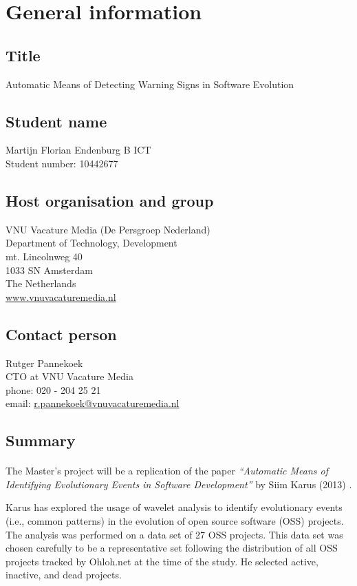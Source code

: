 \section{General information}
\subsection{Title}
Automatic Means of Detecting Warning Signs in Software Evolution

\subsection{Student name}
Martijn Florian Endenburg B ICT \\
Student number: 10442677

\subsection{Host organisation and group}
VNU Vacature Media (De Persgroep Nederland) \\
Department of Technology, Development \\
mt. Lincolnweg 40 \\
1033 SN Amsterdam \\
The Netherlands \\
\href{http://www.vnuvacaturemedia.nl}{www.vnuvacaturemedia.nl}

\subsection{Contact person}
Rutger Pannekoek \\
CTO at VNU Vacature Media \\
phone: 020 - 204 25 21 \\
email:
\href{mailto:r.pannekoek@vnuvacaturemedia.nl}{r.pannekoek@vnuvacaturemedia.nl}

\subsection{Summary}
\paragraph{}
The Master's project will be a replication of the paper \emph{``Automatic Means
of Identifying Evolutionary Events in Software Development''} by Siim Karus
(2013) \cite{karus2013}.

Karus has explored the usage of wavelet analysis to identify evolutionary events
(i.e., common patterns) in the evolution of open source software (OSS) projects.
The analysis was performed on a data set of 27 OSS projects. This data set was chosen
carefully to be a representative set following the distribution of all OSS
projects tracked by Ohloh.net at the time of the study. He selected active,
inactive, and dead projects.

